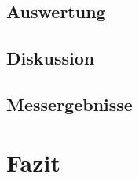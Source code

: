 \documentclass[12pt]{scrartcl}
\begin{document}
\subsection{Auswertung}
\subsection{Diskussion}
\subsection{Messergebnisse}



\section{Fazit}


\end{document}

